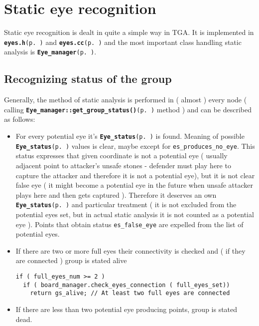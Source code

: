 \section{Static eye recognition}\label{page_4}
Static eye recognition is dealt in quite a simple way in TGA. It is implemented in {\tt {\bf eyes.h}{\rm (p.\,\pageref{eyes_8h})}} and {\tt {\bf eyes.cc}{\rm (p.\,\pageref{eyes_8cc})}} and the most important class handling static analysis is {\tt {\bf Eye\_\-manager}{\rm (p.\,\pageref{classEye__manager})}}. \subsection{Recognizing status of the group}\label{page_4_page_4__sec_1}
Generally, the method of static analysis is performed in ( almost ) every node ( calling {\tt {\bf Eye\_\-manager::get\_\-group\_\-status()}{\rm (p.\,\pageref{classEye__manager_a1})}} method ) and can be described as follows:\begin{itemize}
\item For every potential eye it's {\tt {\bf Eye\_\-status}{\rm (p.\,\pageref{eyes_8h_a12})}} is found. Meaning of possible {\tt {\bf Eye\_\-status}{\rm (p.\,\pageref{eyes_8h_a12})}} values is clear, maybe except for {\tt es\_\-produces\_\-no\_\-eye}. This status expresses that given coordinate is not a potential eye ( usually adjacent point to attacker's unsafe stones - defender must play here to capture the attacker and therefore it is not a potential eye), but it is not clear false eye ( it might become a potential eye in the future when unsafe attacker plays here and then gets captured ). Therefore it deserves an own {\tt {\bf Eye\_\-status}{\rm (p.\,\pageref{eyes_8h_a12})}} and particular treatment ( it is not excluded from the potential eyes set, but in actual static analysis it is not counted as a potential eye ). Points that obtain status {\tt es\_\-false\_\-eye} are expelled from the list of potential eyes.\item If there are two or more full eyes their connectivity is checked and ( if they are connected ) group is stated alive 

\footnotesize\begin{verbatim}if ( full_eyes_num >= 2 ) 
  if ( board_manager.check_eyes_connection ( full_eyes_set))
    return gs_alive; // At least two full eyes are connected
\end{verbatim}
\normalsize
\item If there are less than two potential eye producing points, group is stated dead. 


\end{itemize}
